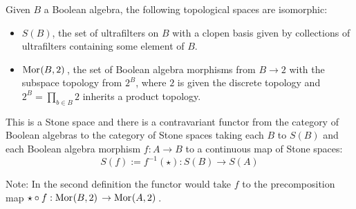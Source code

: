\begin{prop}
    Given $B$ a Boolean algebra, 
    the following topological spaces are isomorphic:
    \begin{itemize}
        \item $S(B)$, 
            the set of ultrafilters on $B$ with a clopen basis given by 
            collections of ultrafilters containing some element of $B$.
        \item $\mathrm{Mor}_{}(B, 2)\,$, 
            the set of Boolean algebra morphisms from $B \to 2$ 
            with the subspace topology from $2^B$, where $2$ is given the 
            discrete topology and $2^B = \prod_{b \in B} 2$ 
            inherits a product topology.
    \end{itemize}
    This is a Stone space and there is a 
    contravariant functor from the category of 
    Boolean algebras to the category of Stone spaces taking each 
    $B$ to $S(B)$
    and each Boolean algebra morphism
    $f: A \to B$ to a continuous map of Stone spaces:
    \[S(f) := f^{-1}(\star) : S(B) \to S(A)\]

    Note:
    In the second definition the functor would take $f$ to the precomposition 
    map $\star \circ f : \mathrm{Mor}_{}(B, 2)\, \to \mathrm{Mor}_{}(A, 2)\,$.
\end{prop}
